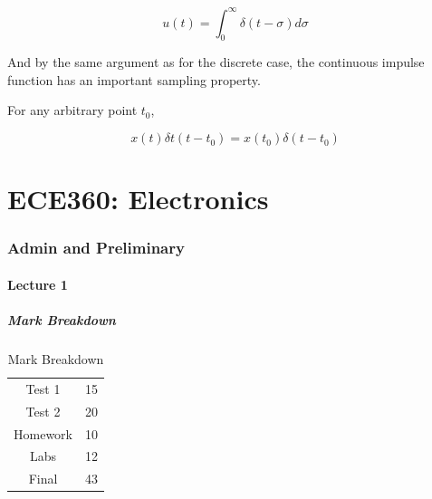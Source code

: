 \documentclass[10pt]{article}
\begin{document}
\begin{equation}
	u(t) = \int^{\infty}_0 \delta(t-\sigma) d\sigma
\end{equation}

\begin{theorem}
	
And by the same argument as for the discrete case, the continuous impulse function has an important sampling property.

	For any arbitrary point $ t_0 $,

	\begin{equation}
		x(t) \delta t(t-t_0) = x(t_0)\delta(t-t_0)
	\end{equation}

\end{theorem}







\part{ECE360: Electronics}


\section{Admin and Preliminary}

\subsection{Lecture 1}



\subsubsection{Mark Breakdown}

\begin{table}[H]
	\centering
	\caption{Mark Breakdown}
	\begin{tabular}{|c|c|}
		\hline
		Test 1 & 15 \\
		Test 2 & 20 \\
		Homework & 10 \\
		Labs & 12 \\
		Final & 43 \\
		\hline
	\end{tabular}
\end{table}
\end{document}
